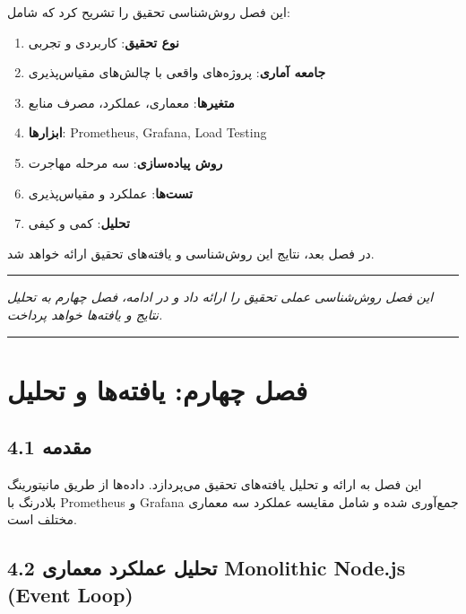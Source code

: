 \documentclass[
]{article}
\providecommand{\tightlist}{%
  \setlength{\itemsep}{0pt}\setlength{\parskip}{0pt}}
\begin{document}
این فصل روش‌شناسی تحقیق را تشریح کرد که شامل:

\begin{enumerate}
\def\labelenumi{\arabic{enumi}.}
\tightlist
\item
  \textbf{نوع تحقیق}: کاربردی و تجربی
\item
  \textbf{جامعه آماری}: پروژه‌های واقعی با چالش‌های مقیاس‌پذیری
\item
  \textbf{متغیرها}: معماری، عملکرد، مصرف منابع
\item
  \textbf{ابزارها}: Prometheus, Grafana, Load Testing
\item
  \textbf{روش پیاده‌سازی}: سه مرحله مهاجرت
\item
  \textbf{تست‌ها}: عملکرد و مقیاس‌پذیری
\item
  \textbf{تحلیل}: کمی و کیفی
\end{enumerate}

در فصل بعد، نتایج این روش‌شناسی و یافته‌های تحقیق ارائه خواهد شد.

\begin{center}\rule{0.5\linewidth}{0.5pt}\end{center}

\emph{این فصل روش‌شناسی عملی تحقیق را ارائه داد و در ادامه، فصل چهارم به
تحلیل نتایج و یافته‌ها خواهد پرداخت.}

\begin{center}\rule{0.5\linewidth}{0.5pt}\end{center}

\section{فصل چهارم: یافته‌ها و
تحلیل}\label{ux641ux635ux644-ux686ux647ux627ux631ux645-ux6ccux627ux641ux62aux647ux647ux627-ux648-ux62aux62dux644ux6ccux644}

\subsection{4.1 مقدمه}\label{ux645ux642ux62fux645ux647-2}

این فصل به ارائه و تحلیل یافته‌های تحقیق می‌پردازد. داده‌ها از طریق
مانیتورینگ بلادرنگ با Prometheus و Grafana جمع‌آوری شده و شامل مقایسه
عملکرد سه معماری مختلف است.

\subsection{4.2 تحلیل عملکرد معماری Monolithic Node.js (Event
Loop)}\label{ux62aux62dux644ux6ccux644-ux639ux645ux644ux6a9ux631ux62f-ux645ux639ux645ux627ux631ux6cc-monolithic-node.js-event-loop}
\end{document}
